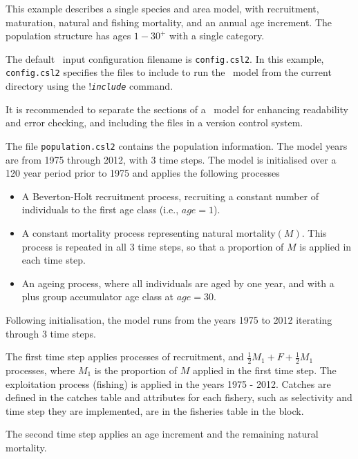 This example describes a single species and area model, with recruitment, maturation, natural and fishing mortality, and an annual age increment. The population structure has ages $1-30^{+}$ with a single category.

The default \CNAME\ input configuration filename is \texttt{config.csl2}. In this example, \texttt{config.csl2} specifies the files to include to run the \CNAME\ model from the current directory using the !\texttt{\emph{include}} command.



It is recommended to separate the sections of a \CNAME\ model for enhancing readability and error checking, and including the files in a version control system.

The file  \texttt{population.csl2} contains the population information. The model years are from 1975 through 2012, with 3 time steps. The model is initialised over a 120 year period prior to 1975 and applies the following processes

\begin{itemize}
\item A Beverton-Holt recruitment process, recruiting a constant number of individuals to the first age class (i.e., $age=1$).

\item A constant mortality process representing natural mortality$(M)$. This process is repeated in all 3 time steps, so that a proportion of $M$ is applied in each time step.

\item An ageing process, where all individuals are aged by one year, and with a plus group accumulator age class at $age=30$.
\end{itemize}

Following initialisation, the model runs from the years 1975 to 2012 iterating through 3 time steps.

The first time step applies processes of recruitment, and  $\frac{1}{2} M_1 + F + \frac{1}{2} M_1$ processes, where $M_1$ is the proportion of $M$ applied in the first time step. The exploitation process (fishing) is applied in the years 1975 - 2012. Catches are defined in the catches table and attributes for each fishery, such as selectivity and time step they are implemented, are in the fisheries table in the  block.

The second time step applies an age increment and the remaining natural mortality.

